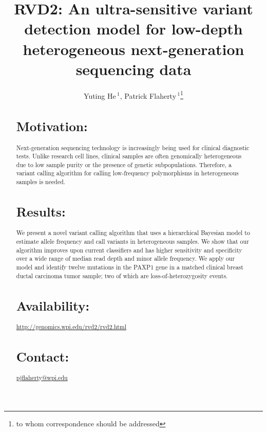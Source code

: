 \documentclass{bioinfo}
\begin{document}

\title[RVD2]{RVD2: An ultra-sensitive variant detection model for low-depth heterogeneous next-generation sequencing data}
\author[He \textit{et~al}]{Yuting He\,$^{1}$, Patrick Flaherty\,$^{1}$\footnote{to whom correspondence should be addressed}}
\address{$^{1}$Department of Biomedical Engineering, Worcester Polytechnic Institute, Worcester, MA, USA}



\maketitle

\begin{abstract}

\section{Motivation:}Next-generation sequencing technology is increasingly being used for clinical diagnostic tests. Unlike research cell lines, clinical samples are often genomically heterogeneous due to low sample purity or the presence of genetic subpopulations. Therefore, a variant calling algorithm for calling low-frequency polymorphisms in heterogeneous samples is needed.

\section{Results:}We present a novel variant calling algorithm that uses a hierarchical Bayesian model to estimate allele frequency and call variants in heterogeneous samples. We show that our algorithm improves upon current classifiers and has higher sensitivity and specificity over a wide range of median read depth and minor allele frequency. We apply our model and identify twelve mutations in the PAXP1 gene in a matched clinical breast ductal carcinoma tumor sample; two of which are loss-of-heterozygosity events.


\section{Availability:}
\href{http://genomics.wpi.edu/rvd2/rvd2.html}{http://genomics.wpi.edu/rvd2/rvd2.html}

\section{Contact:} \href{pjflaherty@wpi.edu}{pjflaherty@wpi.edu}
\end{abstract}
\end{document}
